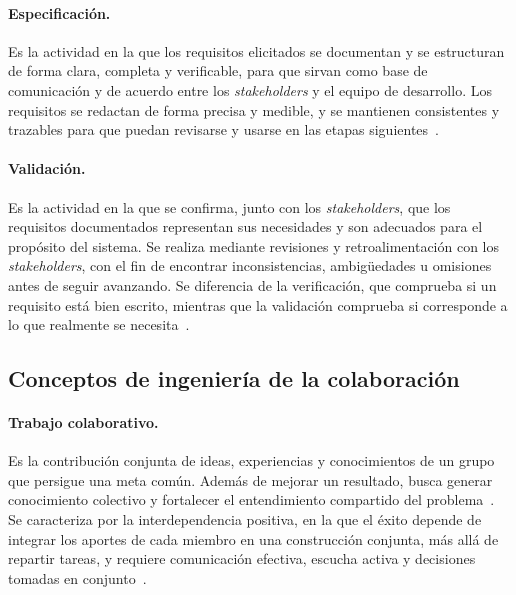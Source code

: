 \documentclass[12pt,letterpaper,oneside]{report}
\begin{document}
\paragraph{Especificación.}
Es la actividad en la que los requisitos elicitados se documentan y se
estructuran de forma clara, completa y verificable, para que sirvan como base de
comunicación y de acuerdo entre los \textit{stakeholders} y el equipo de
desarrollo. Los requisitos se redactan de forma precisa y medible, y se
mantienen consistentes y trazables para que puedan revisarse y usarse en las
etapas siguientes~\cite{iso29148,behutiye2022quality}.

\paragraph{Validación.}
Es la actividad en la que se confirma, junto con los \textit{stakeholders}, que
los requisitos documentados representan sus necesidades y son adecuados para el
propósito del sistema. Se realiza mediante revisiones y retroalimentación con
los \textit{stakeholders}, con el fin de encontrar inconsistencias, ambigüedades u
omisiones antes de seguir avanzando. Se diferencia de la
verificación, que comprueba si un requisito está bien escrito, mientras que la
validación comprueba si corresponde a lo que realmente se necesita~\cite{iso29148}.

\subsection{Conceptos de ingeniería de la colaboración}

\paragraph{Trabajo colaborativo.}
Es la contribución conjunta de ideas, experiencias y conocimientos de un grupo
que persigue una meta común. Además de mejorar un resultado, busca generar conocimiento colectivo y
fortalecer el entendimiento compartido del problema~\cite{agredo2022thesis}. Se
caracteriza por la interdependencia positiva, en la que el éxito depende de
integrar los aportes de cada miembro en una construcción conjunta, más allá de
repartir tareas, y requiere
comunicación efectiva, escucha activa y decisiones tomadas en
conjunto~\cite{spijkman2021alignment}.
\end{document}
